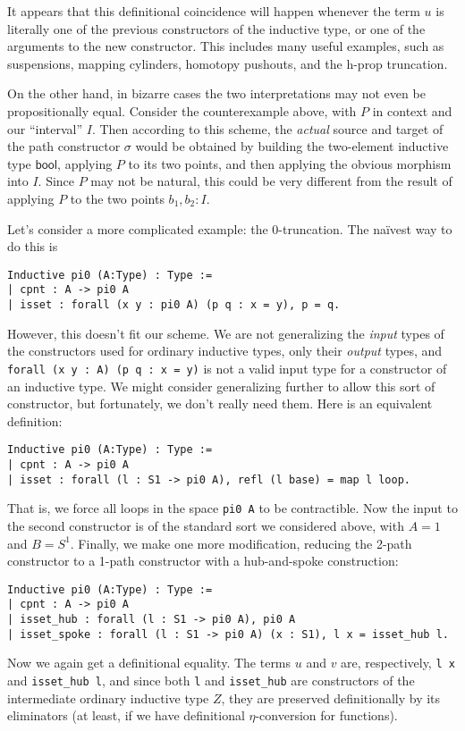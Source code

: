 \documentclass{amsart}
\begin{document}
It appears that this definitional coincidence will happen whenever the term $u$ is literally one of the previous constructors of the inductive type, or one of the arguments to the new constructor.  This includes many useful examples, such as suspensions, mapping cylinders, homotopy pushouts, and the h-prop truncation.

On the other hand, in bizarre cases the two interpretations may not even be propositionally equal. Consider the counterexample above, with $P$ in context and our ``interval'' $I$.  Then according to this scheme, the \emph{actual} source and target of the path constructor $\sigma$ would be obtained by building the two-element inductive type $\mathsf{bool}$, applying $P$ to its two points, and then applying the obvious morphism into $I$.  Since $P$ may not be natural, this could be very different from the result of applying $P$ to the two points $b_1,b_2:I$.

Let's consider a more complicated example: the 0-truncation.  The na\"ivest way to do this is
\begin{verbatim}
Inductive pi0 (A:Type) : Type :=
| cpnt : A -> pi0 A
| isset : forall (x y : pi0 A) (p q : x = y), p = q.
\end{verbatim}
However, this doesn't fit our scheme.  We are not generalizing the \emph{input} types of the constructors used for ordinary inductive types, only their \emph{output} types, and \texttt{forall (x y : A) (p q : x = y)} is not a valid input type for a constructor of an inductive type.  We might consider generalizing further to allow this sort of constructor, but fortunately, we don't really need them.  Here is an equivalent definition:
\begin{verbatim}
Inductive pi0 (A:Type) : Type :=
| cpnt : A -> pi0 A
| isset : forall (l : S1 -> pi0 A), refl (l base) = map l loop.
\end{verbatim}
That is, we force all loops in the space \texttt{pi0 A} to be contractible.  Now the input to the second constructor is of the standard sort we considered above, with $A=1$ and $B = S^1$.
Finally, we make one more modification, reducing the 2-path constructor to a 1-path constructor with a hub-and-spoke construction:
\begin{verbatim}
Inductive pi0 (A:Type) : Type :=
| cpnt : A -> pi0 A
| isset_hub : forall (l : S1 -> pi0 A), pi0 A
| isset_spoke : forall (l : S1 -> pi0 A) (x : S1), l x = isset_hub l.
\end{verbatim}
Now we again get a definitional equality.  The terms $u$ and $v$ are, respectively, \texttt{l x} and \verb|isset_hub l|, and since both \texttt{l} and \verb|isset_hub| are constructors of the intermediate ordinary inductive type $Z$, they are preserved definitionally by its eliminators (at least, if we have definitional $\eta$-conversion for functions).
\end{document}
